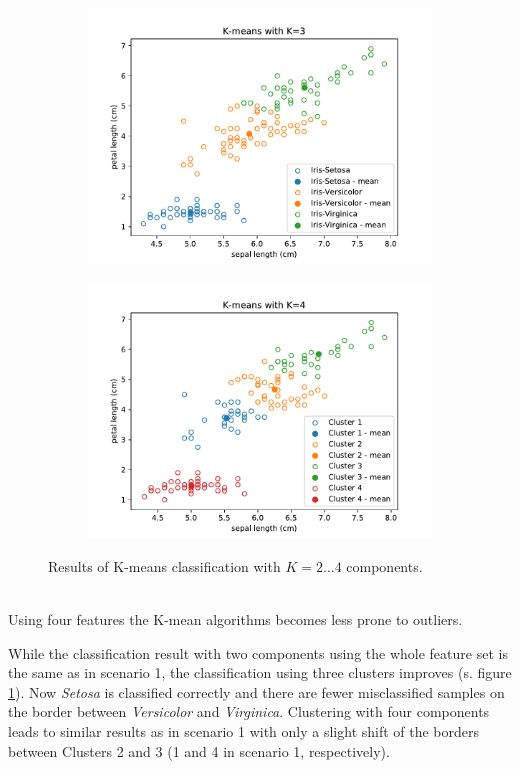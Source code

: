 \documentclass{article}
\begin{document}
\begin{figure}[!ht]
{\begin{subfigure}{0.6\textwidth}
	\includegraphics[width=\textwidth]{./Figures/2_2_Kmeans_scatter_K3}
	\end{subfigure}
	\begin{subfigure}{0.6\textwidth}
	\includegraphics[width=\textwidth]{./Figures/2_2_Kmeans_scatter_K4}
	\end{subfigure}
	}	
	\caption{Results of K-means classification with $K=2\dots4$ components.}
	\label{2_2_Kmeans_scatter}
\end{figure}\\

Using four features the K-mean algorithms becomes less prone to outliers. 

While the classification result with two components using the whole feature set is the same as in scenario 1, the classification using three clusters improves (s. figure \ref{2_2_Kmeans_scatter}). Now \textit{Setosa} is classified correctly and there are fewer misclassified samples on the border between \textit{Versicolor} and \textit{Virginica}. Clustering with four components leads to similar results as in scenario 1 with only a slight shift of the borders between Clusters 2 and 3 (1 and 4 in scenario 1, respectively).
\end{document}
